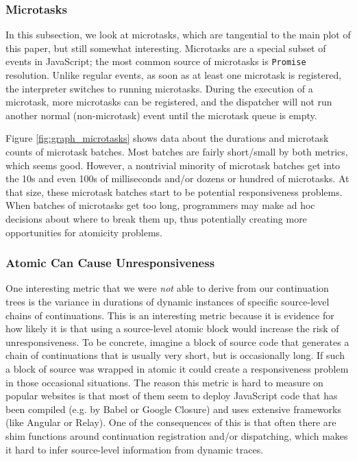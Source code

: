 \documentclass[acmsmall,anonymous,review]{acmart}\settopmatter{printfolios=true,printccs=false,printacmref=false}
\begin{document}
\subsubsection{Microtasks}

In this subsection, we look at microtasks, which are tangential to the main plot of this paper, but still somewhat interesting.
Microtasks are a special subset of events in JavaScript; the most common source of microtasks is \texttt{Promise} resolution.
Unlike regular events, as soon as at least one microtask is registered, the interpreter switches to running microtasks.
During the execution of a microtask, more microtasks can be registered, and the dispatcher will not run another normal (non-microtask) event until the microtask queue is empty.

Figure \ref{fig:graph_microtasks} shows data about the durations and microtask counts of microtask batches.
Most batches are fairly short/small by both metrics, which seems good.
However, a nontrivial minority of microtask batches get into the 10s and even 100s of milliseconds and/or dozens or hundred of microtasks.
At that size, these microtask batches start to be potential responsiveness problems.
When batches of microtasks get too long, programmers may make ad hoc decisions about where to break them up, thus potentially creating more opportunities for atomicity problems.

\subsubsection{Atomic Can Cause Unresponsiveness}

One interesting metric that we were \emph{not} able to derive from our continuation trees is the variance in durations of dynamic instances of specific source-level chains of continuations.
This is an interesting metric because it is evidence for how likely it is that using a source-level atomic block would increase the risk of unresponsiveness.
To be concrete, imagine a block of source code that generates a chain of continuations that is usually very short, but is occasionally long.
If such a block of source was wrapped in atomic it could create a responsiveness problem in those occasional situations.
The reason this metric is hard to measure on popular websites is that most of them seem to deploy JavaScript code that has been compiled (e.g. by Babel or Google Closure) and uses extensive frameworks (like Angular or Relay).
One of the consequences of this is that often there are shim functions around continuation registration and/or dispatching, which makes it hard to infer source-level information from dynamic traces.
\end{document}
